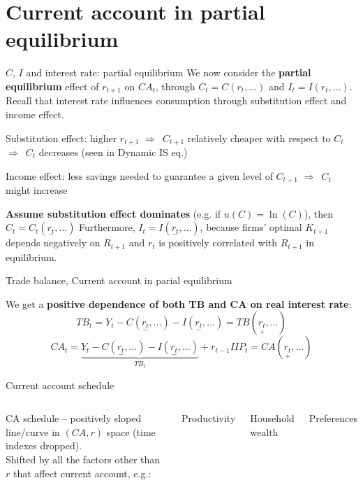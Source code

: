 \documentclass{beamer}
\newenvironment{mytemize}
{\vfill\itemize[nolistsep,itemsep=\fill,label=\color{blue}{$\triangleright$}]}
  {\enditemize}
\newenvironment{mynumerate}
{\vfill\enumerate[nolistsep,itemsep=\fill,label=\arabic*.]}
  {\endenumerate}
\newcommand{\rarr}{$\Rightarrow$\ }
\begin{document}
\section{Current account in partial equilibrium} 

\begin{frame}{$C$, $I$ and interest rate: partial equilibrium}
  We now consider the \textbf{partial equilibrium} effect of $r_{t+1}$ on $CA_t$, through $C_t = C(r_{t}, \dots)$ and $I_t = I(r_{t}, \dots)$.
  \vfill
  Recall that interest rate influences consumption through substitution effect and income effect.
  \begin{mynumerate}
  \item Substitution effect: higher $r_{t+1}$ \rarr $C_{t+1}$ relatively cheaper with respect to $C_t$ \rarr $C_t$ decreases (seen in Dynamic IS eq.)
  \item Income effect: less savings needed to guarantee a given level of $C_{t+1}$ \rarr $C_t$ might increase
  \end{mynumerate}

  \textbf{Assume substitution effect dominates} (e.g. if $u(C) = \ln(C)$), then $C_t = C_t(\underset{-}{r_{t}}, \dots)$
  \vfill 
  Furthermore, $I_t = I(\underset{-}{r_{t}}, \dots)$, because firms' optimal $K_{t+1}$ depends negatively on $R_{t+1}$ and $r_t$ is positively correlated with $R_{t+1}$ in equilibrium.
\end{frame}

\begin{frame}{Trade balance, Current account in parial equilibrium}

We get a \textbf{positive dependence of both TB and CA on real interest rate}:
      $$TB_t = Y_t - C(\underset{-}{r_{t}},\dots) - I(\underset{-}{r_{t}}, \dots)= TB(\underset{+}{r_{t}},\dots)$$
      $$CA_t = \underbrace{Y_t - C(\underset{-}{r_{t}},\dots) - I(\underset{-}{r_{t}}, \dots)}_{TB_t} +  r_{t-1} IIP_t = CA(\underset{+}{r_{t}},\dots)$$
\end{frame}

\begin{frame}{Current account schedule}
  \begin{columns}
	 CA schedule -- positively sloped line/curve in $(CA, r)$ space (time indexes dropped).\\
	\vfill
  Shifted by all the factors other than $r$ that affect current account, e.g.:
  \begin{mytemize}
	\item Productivity 
	\item Household wealth 
	\item Preferences
  \end{mytemize}
  \end{columns}
  \end{frame}
\end{document}

